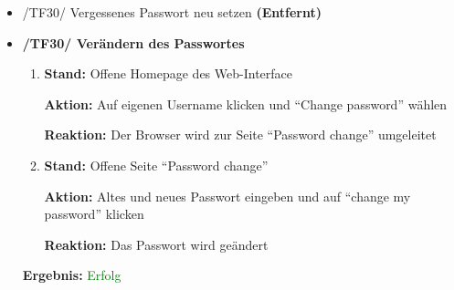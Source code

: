 \documentclass[a4paper]{scrreprt}
\begin{document}
\begin{itemize}
                \item /TF30/ Vergessenes Passwort neu setzen \textbf{(Entfernt)}
		        \vspace*{0.6cm}
		        
				\item \textbf{/TF30/ Ver\"andern des Passwortes}
                        \begin{enumerate}
                            \item \par \textbf{Stand: }Offene Homepage des Web-Interface
                                \par \textbf{Aktion: }Auf eigenen Username klicken und ``Change password'' w\"ahlen
                                \par \textbf{Reaktion: }Der Browser wird zur Seite ``Password change'' umgeleitet
							\item \par \textbf{Stand: }Offene Seite ``Password change''
                                \par \textbf{Aktion: }Altes und neues Passwort eingeben und auf ``change my password'' klicken
                                \par \textbf{Reaktion: }Das Passwort wird ge\"andert                                
                        \end{enumerate}		         
		           \vspace*{0.3cm}
		           \par \textbf{Ergebnis: }\textcolor{green}{Erfolg}
		           \vspace*{0.6cm}		        
		           

\end{itemize}
\end{document}

